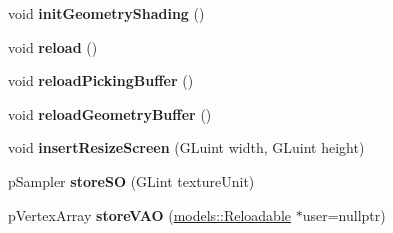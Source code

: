 \begin{DoxyCompactItemize}
\item 
\hypertarget{structfillwave_1_1Engine_1_1EngineImpl_a66dac6a37a653db98e30adef7de3850a}{}void {\bfseries init\+Geometry\+Shading} ()\label{structfillwave_1_1Engine_1_1EngineImpl_a66dac6a37a653db98e30adef7de3850a}

\item 
\hypertarget{structfillwave_1_1Engine_1_1EngineImpl_a5691ec3bd35bf65e841cdb16cd83667d}{}void {\bfseries reload} ()\label{structfillwave_1_1Engine_1_1EngineImpl_a5691ec3bd35bf65e841cdb16cd83667d}

\item 
\hypertarget{structfillwave_1_1Engine_1_1EngineImpl_aeb0ec4eb1da84a0fbefb3c283c47300a}{}void {\bfseries reload\+Picking\+Buffer} ()\label{structfillwave_1_1Engine_1_1EngineImpl_aeb0ec4eb1da84a0fbefb3c283c47300a}

\item 
\hypertarget{structfillwave_1_1Engine_1_1EngineImpl_af245d3daa135993c76d40c3e4fc450f6}{}void {\bfseries reload\+Geometry\+Buffer} ()\label{structfillwave_1_1Engine_1_1EngineImpl_af245d3daa135993c76d40c3e4fc450f6}

\item 
\hypertarget{structfillwave_1_1Engine_1_1EngineImpl_a4f48c92602eebbc0e2117ee6ff409016}{}void {\bfseries insert\+Resize\+Screen} (G\+Luint width, G\+Luint height)\label{structfillwave_1_1Engine_1_1EngineImpl_a4f48c92602eebbc0e2117ee6ff409016}

\item 
\hypertarget{structfillwave_1_1Engine_1_1EngineImpl_ae4305e7e95e904d4d631605c9ce2a347}{}p\+Sampler {\bfseries store\+S\+O} (G\+Lint texture\+Unit)\label{structfillwave_1_1Engine_1_1EngineImpl_ae4305e7e95e904d4d631605c9ce2a347}

\item 
\hypertarget{structfillwave_1_1Engine_1_1EngineImpl_a79a5f7b2f4fde0f99d76448aa05baf48}{}p\+Vertex\+Array {\bfseries store\+V\+A\+O} (\hyperlink{classfillwave_1_1models_1_1Reloadable}{models\+::\+Reloadable} $\ast$user=nullptr)\label{structfillwave_1_1Engine_1_1EngineImpl_a79a5f7b2f4fde0f99d76448aa05baf48}

\end{DoxyCompactItemize}
